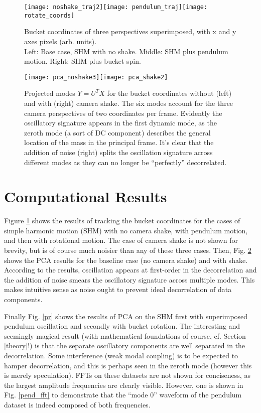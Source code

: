 \documentclass{article}
\begin{document}
\begin{figure}[t!]
  \centering
  \texttt{[image: noshake\_traj2]}\quad\texttt{[image: pendulum\_traj]}\quad\texttt{[image: rotate\_coords]}
  \caption{Bucket coordinates of three perspectives superimposed, with x and y axes pixels (arb. units).\\Left: Base case, SHM with no shake. Middle: SHM plus pendulum motion. Right: SHM plus bucket spin.}\label{coords}
\end{figure}

\begin{figure}
  \centering
  \texttt{[image: pca\_noshake3]}\quad\texttt{[image: pca\_shake2]}
  \caption{Projected modes $Y = U^TX$ for the bucket coordinates without (left) and with (right) camera shake. The six modes account for the three camera perspectives of two coordinates per frame. Evidently the oscillatory signature appears in the first dynamic mode, as the zeroth mode (a sort of DC component) describes the general location of the mass in the principal frame. It's clear that the addition of noise (right) splits the oscillation signature across different modes as they can no longer be ``perfectly'' decorrelated.}\label{sns}
\end{figure}

\section{Computational Results}
Figure \ref{coords} shows the results of tracking the bucket coordinates for the cases of simple harmonic motion (SHM) with no camera shake, with pendulum motion, and then with rotational motion. The case of camera shake is not shown for brevity, but is of course much noisier than any of these three cases. Then, Fig. \ref{sns} shows the PCA results for the baseline case (no camera shake) and with shake. According to the results, oscillation appears at first-order in the decorrelation and the addition of noise smears the oscillatory signature across multiple modes. This makes intuitive sense as noise ought to prevent ideal decorrelation of data components.

Finally Fig. \ref{pr} shows the results of PCA on the SHM first with superimposed pendulum oscillation and secondly with bucket rotation. The interesting and seemingly magical result (with mathematical foundations of course, cf. Section \ref{theory}!) is that the separate oscillatory components are well separated in the decorrelation. Some interference (weak modal coupling) is to be expected to hamper decorrelation, and this is perhaps seen in the zeroth mode (however this is merely speculation). FFTs on these datasets are not shown for conciseness, as the largest amplitude frequencies are clearly visible. However, one is shown in Fig. \ref{pend_fft} to demonstrate that the ``mode 0'' waveform of the pendulum dataset is indeed composed of both frequencies.
\end{document}
